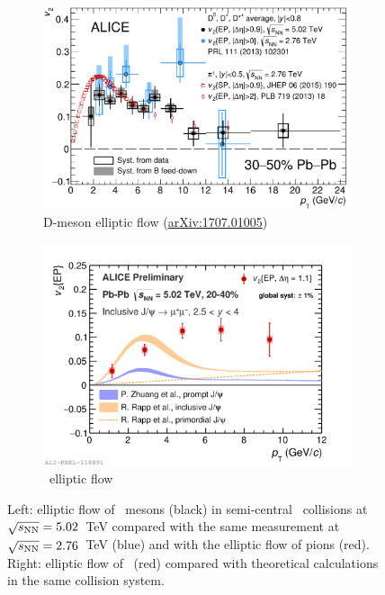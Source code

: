 \documentclass[10pt]{article}
\begin{document}
\begin{figure}[tb]
\centering
\begin{subfigure}[b]{0.47\textwidth}
  \centering
  \includegraphics[width=1.0\linewidth]{img/DmesonPions-eps-converted-to-25145}
  \caption{D-meson elliptic flow (\href{https://arxiv.org/abs/1707.01005}{arXiv:1707.01005})}
  \label{fig:v2d0}
\end{subfigure} \quad
\begin{subfigure}[b]{0.50\textwidth}
  \centering
  \includegraphics[width=1.0\linewidth]{img/2017-Feb-03-jpsiv2_theory}
  \caption{\jpsi\ elliptic flow}
  \label{fig:v2jpsi}
\end{subfigure} \quad
\caption{Left: elliptic flow of \Dzero\ mesons (black) in semi-central \PbPb\ collisions at $\sqrt{s_{\rm NN}}=5.02$~TeV compared with the same measurement at $\sqrt{s_{\rm NN}}=2.76$~TeV (blue)
and with the elliptic flow of pions (red). Right: elliptic flow of \jpsi\ (red) compared with theoretical calculations in the same collision system.}
\end{figure}
\end{document}
